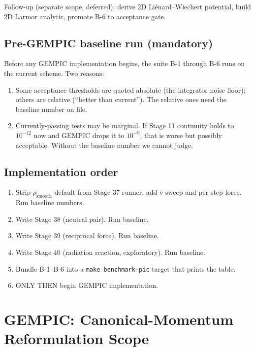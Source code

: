 \documentclass[11pt,a4paper]{article}
\begin{document}
Follow-up (separate scope, deferred): derive 2D Liénard--Wiechert
potential, build 2D Larmor analytic, promote B-6 to acceptance gate.

\subsection{Pre-GEMPIC baseline run (mandatory)}

Before any GEMPIC implementation begins, the suite B-1 through B-6
runs on the current scheme.  Two reasons:

\begin{enumerate}
  \item Some acceptance thresholds are quoted absolute (the
    integrator-noise floor); others are relative (``better than
    current'').  The relative ones need the baseline number on
    file.
  \item Currently-passing tests may be marginal.  If Stage 11
    continuity holds to $10^{-12}$ now and GEMPIC drops it to
    $10^{-9}$, that is worse but possibly acceptable.  Without the
    baseline number we cannot judge.
\end{enumerate}

\subsection{Implementation order}

\begin{enumerate}
  \item Strip $\rho_{\mathrm{smooth}}$ default from Stage 37
    runner, add v-sweep and per-step force.  Run baseline numbers.
  \item Write Stage 38 (neutral pair).  Run baseline.
  \item Write Stage 39 (reciprocal force).  Run baseline.
  \item Write Stage 40 (radiation reaction, exploratory).  Run baseline.
  \item Bundle B-1--B-6 into a \texttt{make benchmark-pic} target
    that prints the table.
  \item ONLY THEN begin GEMPIC implementation.
\end{enumerate}

\newpage

\section{GEMPIC: Canonical-Momentum Reformulation Scope}
\label{sec:gempic_design}
\end{document}

